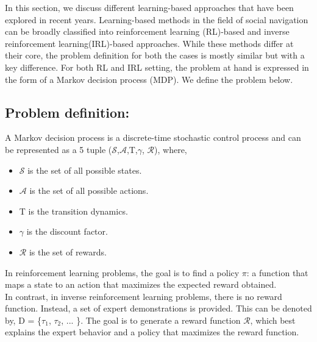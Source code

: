 \label{ch:3}
In this section, we discuss different learning-based approaches that have been explored in recent years. Learning-based methods in the field of social navigation can be broadly classified into reinforcement learning (RL)-based and inverse reinforcement learning(IRL)-based approaches. While these methods differ at their core, the problem definition for both the cases is mostly similar but with a key difference. For both RL and IRL setting, the problem at hand is expressed in the form of a Markov decision process (MDP). We define the problem below.
\subsection*{Problem definition:}
A Markov decision process is a discrete-time stochastic control process and can be represented as a 5 tuple
($\mathcal{S}$,$\mathcal{A}$,T,$\gamma$, $\mathcal{R}$), where,
\begin{itemize}
    \item $\mathcal{S}$ is the set of all possible states.
    \item $\mathcal{A}$ is the set of all possible actions.
    \item T is the transition dynamics.
    \item $\gamma$ is the discount factor.
    \item $\mathcal{R}$ is the set of rewards.
\end{itemize}  
In reinforcement learning problems, the goal is to find a policy $\pi$: a function that maps a state to an action that maximizes the expected reward obtained.\\
In contrast, in inverse reinforcement learning problems, there is no reward function. Instead, a set of expert demonstrations is provided. This can be denoted by, D = \{$\tau_1$, $\tau_2$, ... \}. The goal is to generate a reward function $\mathcal{R}$, which best explains the expert behavior and a policy that maximizes the reward function.


